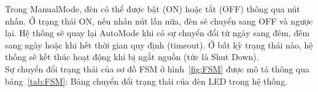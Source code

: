 {Trong ManualMode, đèn có thể được bật (ON) hoặc tắt (OFF) thông qua nút nhấn. Ở trạng thái ON, nếu nhấn nút lần nữa, đèn sẽ chuyển sang OFF và ngược lại. Hệ thống sẽ quay lại AutoMode khi có sự chuyển đổi từ ngày sang đêm, đêm sang ngày hoặc khi hết thời gian quy định (timeout). Ở bất kỳ trạng thái nào, hệ thống sẽ kết thúc hoạt động khi bị ngắt nguồn (tức là Shut Down).\\

Sự chuyển đổi trạng thái của sơ đồ FSM ở hình~\ref{fig:FSM} được mô tả thông qua bảng~\ref{tab:FSM}: Bảng chuyển đổi trạng thái của đèn LED trong hệ thống. 

\begin{table}[H]
\centering
\small
\begin{tabular}{|p{2.3cm}|p{3cm}|p{4cm}|p{2cm}|p{4cm}|}
\hline


\end{tabular}
\end{table}}
